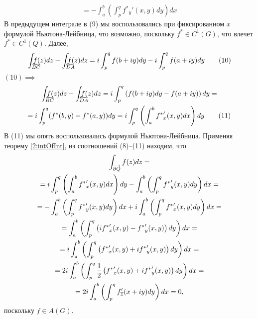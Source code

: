 \documentclass[main]{subfiles}
\begin{document}
\begin{longProof}
\begin{multline*}
        = - \int_{a}^{b} \left( \int_{p}^{q} {f^*}_y' (x, y) dy\right) dx \tag{9}
    \end{multline*}
    В предыдущем интеграле в (9) мы воспользовались при фиксированном $x$ формулой Ньютона-Лейбница, что возможно, поскольку $f^* \in C^1(G)$, что влечет $f^* \in C^1(Q)$.
    Далее,
    \[\AnClOrInt[\mathrlap{\AnClOrCurve[BC]}] f(z) dz - \ClOrInt[\mathrlap{\ClOrCurve[DA]}] f(z) dz = i \int_{p}^{q} f(b + iy) dy - i \int_{p}^{q} f(a + iy) dy \tag{10}\]
    $(10) \implies$
    \begin{multline*}
        \AnClOrInt[\mathrlap{\AnClOrCurve[BC]}] f(z) dz - \ClOrInt[\mathrlap{\ClOrCurve[DA]}] f(z) dz = i \int_{p}^{q} \left( f(b + iy) dy - f(a + iy) \right) dy = \\
        = i \int_{p}^{q} (f^*(b, y) - f^*(a, y)) dy = i \int_{p}^{q} \left( \int_{a}^{b} {f^*}_x' (x, y) dx\right) dy \tag{11}
    \end{multline*}
    В (11) мы опять воспользовались формулой Ньютона-Лейбница.
    Применяя теорему \ref{2:intOfInt}, из соотношений (8)--(11) находим, что
    \begin{multline*}
        \AnClOrInt[\AnClOrCurve[\partial Q]] f(z) dz = \\
        = i \int_{p}^{q} \left( \int_{a}^{b} {f^*}_x' (x, y) dx\right) dy - \int_{a}^{b} \left( \int_{p}^{q} {f^*}_y' (x, y) dy\right) dx = \\
        = - \int_{a}^{b} \left( \int_{p}^{q} {f^*}_y' (x, y) dy\right) dx + i \int_{a}^{b} \left( \int_{p}^{q} {f^*}_x' (x, y) dy\right) dx = \\
        = \int_{a}^{b} \left( \int_{p}^{q} \left( i {f^*}_x' (x, y) - {f^*}_y'(x, y)\right) dy \right) dx = \\
        = i \int_{a}^{b} \left( \int_{p}^{q} \left( {f^*}_x' (x, y) + i {f^*}_y'(x, y)\right) dy \right) dx = \\
        = 2 i \int_{a}^{b} \left( \int_{p}^{q} \frac{1}{2} \left( {f^*}_x' (x, y) + i {f^*}_y'(x, y)\right) dy \right) dx = \\
        = 2 i \int_{a}^{b} \left( \int_{p}^{q} f_{\overline{z}}' (x + iy) dy\right) dx = 0,
    \end{multline*}
    поскольку $f \in A(G)$.
\end{longProof}
\end{document}
